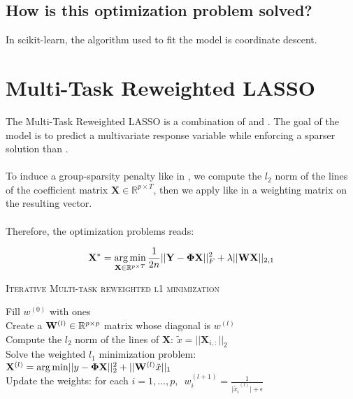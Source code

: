\documentclass[a4paper,10pt]{article}
\theoremstyle{definition}
\begin{document}
\subsection*{How is this optimization problem solved?}

In scikit-learn, the algorithm used to fit the model is coordinate descent.

\section{Multi-Task Reweighted LASSO}
\label{section_5}

The Multi-Task Reweighted LASSO is a combination of  and . The goal of the model is to predict a multivariate response variable while enforcing a sparser solution than .
\\
\\
To induce a group-sparsity penalty like in , we compute the $l_2$ norm of the lines of the coefficient matrix $\mathbf{X} \in \mathbb{R}^{p \times T}$, then we apply like in  a weighting matrix
on the resulting vector. 
\\
\\
Therefore, the optimization problems reads:

\begin{equation*}
    \mathbf{X}^* = \operatorname*{arg\,min}_{\mathbf{X} \in \mathbb{R}^{p \times T}} \frac{1}{2n} \lvert\lvert \mathbf{Y} - \mathbf{\Phi X} \rvert\rvert_F^2 + \lambda \lvert\lvert \mathbf{WX} \rvert\rvert_{2, 1}
\end{equation*}

\vskip 0.2in

{\fontsize{4}{4}\selectfont
\begin{algorithm}[h]  %
\caption{\textsc{Iterative Multi-task reweighted l1 minimization}
}
%

    Fill $w^{(0)}$ with ones \\
    {
        Create a $\mathbf{W}^{(l)} \in \mathbb{R}^{p\times p}$ matrix whose diagonal is $w^{(l)}$ \\
        Compute the $l_2$ norm of the lines of $\mathbf{X}$: $\tilde{x} = \lvert\lvert \mathbf{X}_{i,:} \rvert\rvert_2$ \\
        Solve the weighted $l_1$ minimization problem: $\mathbf{X}^{(l)} = \operatorname*{arg\,min} \lvert\lvert y -  \mathbf{\Phi} \mathbf{X}\rvert\rvert_2^2 + \lvert\lvert \mathbf{W}^{(l)}\tilde{x}\rvert\rvert_1$ \\
        Update the weights: for each $i = 1, ..., p, \enspace w_i^{(l+1)} = \frac{1}{\lvert \tilde{x_i}^{(l)} \rvert + \epsilon}$
    }

\end{algorithm}
}


\newpage


 
\end{document}
